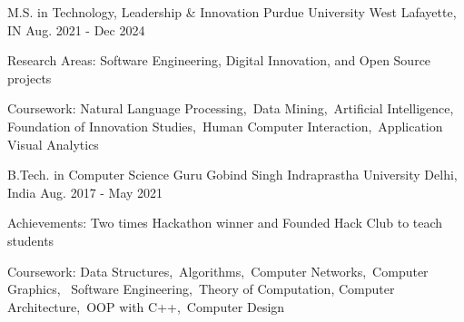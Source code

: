 



\begin{cventries}

  \cventry
    {M.S. in Technology, Leadership \& Innovation} %
    {Purdue University} %
    {West Lafayette, IN} %
    {Aug. 2021 - Dec 2024} %
    {
      \begin{cvitems} %
        \item { Research Areas:  \hspace*{0.1cm}  Software Engineering, Digital Innovation, and Open Source projects  }
        \item { Coursework: \hspace*{0.65cm} Natural Language Processing,\, Data Mining,\, Artificial Intelligence,\, Foundation of Innovation Studies,\, Human Computer      
                            \hspace*{2.55cm}  Interaction,\, Application Visual Analytics}
      \end{cvitems}
    }
    
    \cventry
    {B.Tech. in Computer Science} %
    {Guru Gobind Singh Indraprastha University} %
    {Delhi, India} %
    {Aug. 2017 - May 2021} %
    {
      \begin{cvitems} %
        \item { Achievements: \hspace*{0.36cm}  Two times Hackathon winner and Founded Hack Club to teach students}
        \item { Coursework: \hspace*{0.65cm} Data Structures,\, Algorithms,\, Computer Networks,\, Computer Graphics, \, Software Engineering,\, Theory of Computation, 
                            \hspace*{2.55cm}  Computer Architecture,\, OOP with C++,\, Computer Design}
      \end{cvitems}
    }

      \end{cventries}
       
